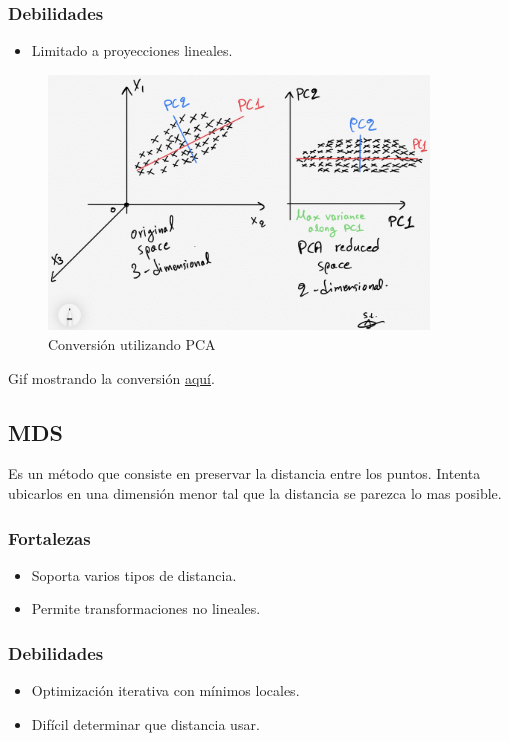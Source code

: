 \documentclass[titlepage,a4paper]{article}
\begin{document}
\subsubsection*{Debilidades}
\begin{itemize}
    \item Limitado a proyecciones lineales.
\end{itemize}

\begin{figure}[!htb]
    \centering
    \includegraphics[width=0.9\textwidth]{imagenesResumen/PCA.jpeg}
    \caption{Conversión utilizando PCA}
\end{figure}

Gif mostrando la conversión \href{https://miro.medium.com/max/1556/1*T7CqlFV5aRm6MxO5nJt7Qw.gif}{aquí}.

\subsection{MDS}

Es un método que consiste en preservar la distancia entre los puntos. Intenta ubicarlos en una dimensión menor tal que la distancia se parezca lo mas posible.

\subsubsection*{Fortalezas}
\begin{itemize}
    \item Soporta varios tipos de distancia.
    \item Permite transformaciones no lineales.
\end{itemize}

\subsubsection*{Debilidades}
\begin{itemize}
    \item Optimización iterativa con mínimos locales.
    \item Difícil determinar que distancia usar.
\end{itemize}
\end{document}
